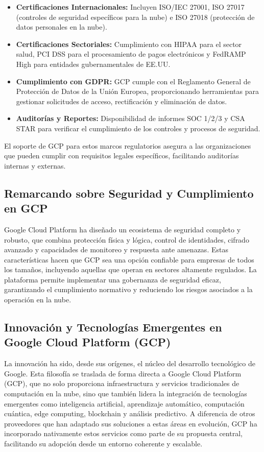 {                \begin{itemize}
                    \item \textbf{Certificaciones Internacionales:} Incluyen ISO/IEC 27001, ISO 27017 (controles de seguridad específicos para la nube) e ISO 27018 (protección de datos personales en la nube).
                    \item \textbf{Certificaciones Sectoriales:} Cumplimiento con HIPAA para el sector salud, PCI DSS para el procesamiento de pagos electrónicos y FedRAMP High para entidades gubernamentales de EE.UU.
                    \item \textbf{Cumplimiento con GDPR:} GCP cumple con el Reglamento General de Protección de Datos de la Unión Europea, proporcionando herramientas para gestionar solicitudes de acceso, rectificación y eliminación de datos.
                    \item \textbf{Auditorías y Reportes:} Disponibilidad de informes SOC 1/2/3 y CSA STAR para verificar el cumplimiento de los controles y procesos de seguridad.
                \end{itemize}
            
                El soporte de GCP para estos marcos regulatorios asegura a las organizaciones que pueden cumplir con requisitos legales específicos, facilitando auditorías internas y externas.
            
            \subsection{Remarcando sobre Seguridad y Cumplimiento en GCP}
                Google Cloud Platform ha diseñado un ecosistema de seguridad completo y robusto, que combina protección física y lógica, control de identidades, cifrado avanzado y capacidades de monitoreo y respuesta ante amenazas. Estas características hacen que GCP sea una opción confiable para empresas de todos los tamaños, incluyendo aquellas que operan en sectores altamente regulados. La plataforma permite implementar una gobernanza de seguridad eficaz, garantizando el cumplimiento normativo y reduciendo los riesgos asociados a la operación en la nube.

        \subsection{Innovación y Tecnologías Emergentes en Google Cloud Platform (GCP)}
            La innovación ha sido, desde sus orígenes, el núcleo del desarrollo tecnológico de Google. Esta filosofía se traslada de forma directa a Google Cloud Platform (GCP), que no solo proporciona infraestructura y servicios tradicionales de computación en la nube, sino que también lidera la integración de tecnologías emergentes como inteligencia artificial, aprendizaje automático, computación cuántica, edge computing, blockchain y análisis predictivo. A diferencia de otros proveedores que han adaptado sus soluciones a estas áreas en evolución, GCP ha incorporado nativamente estos servicios como parte de su propuesta central, facilitando su adopción desde un entorno coherente y escalable.
            
}
